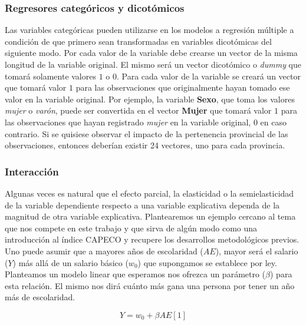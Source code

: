 \subsubsection{Regresores categóricos y dicotómicos }

Las variables categóricas pueden utilizarse en los modelos a regresión múltiple a condición de que primero sean transformadas en variables dicotómicas del siguiente modo. Por cada valor de la variable debe crearse un vector de la misma longitud de la variable original. El mismo será un vector dicotómico o \textit{dummy} que tomará solamente valores $1$ o $0$. Para cada valor de la variable se creará un vector que tomará valor $1$ para las observaciones que originalmente hayan tomado ese valor en la variable original. Por ejemplo, la variable \textbf{Sexo}, que toma los valores \textit{mujer} o \textit{varón}, puede ser convertida en el vector \textbf{Mujer} que tomará valor $1$ para las observaciones que hayan registrado \textit{mujer} en la variable original, $0$ en caso contrario. Si se quisiese observar el impacto de la pertenencia provincial de las observaciones, entonces deberían existir 24 vectores, uno para cada provincia. 


\subsubsection{Interacción}
Algunas veces es natural que el efecto parcial, la elasticidad o la semielasticidad de la variable dependiente respecto a una variable explicativa dependa de la magnitud de otra variable explicativa. Plantearemos un ejemplo cercano al tema que nos compete en este trabajo y que sirva de algún modo como una introducción al índice CAPECO y recupere los desarrollos metodológicos previos. Uno puede asumir que a mayores años de escolaridad ($AE$), mayor será el salario ($Y$) más allá de un salario básico ($w_0$) que supongamos se establece por ley. Planteamos un modelo linear que esperamos nos ofrezca un parámetro ($\beta$) para esta relación. El mismo nos dirá cuánto más gana una persona por tener un año más de escolaridad. 


$$Y = w_0 + \beta AE [1]$$ 

